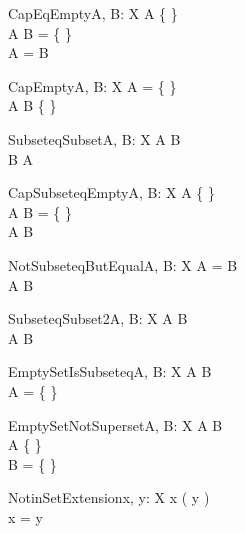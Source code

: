 \begin{theorem}{CapEqEmpty}{A, B: \power X}
A \neq \{ \} \\
A \cap B = \{ \} \\
A = B
\end{theorem}

\begin{theorem}{CapEmpty}{A, B: \power X}
A = \{ \} \\
A \cap B \neq \{ \}
\end{theorem}

\begin{theorem}{SubseteqSubset}{A, B: \power X}
A \subseteq B \\
B \subset A
\end{theorem}

\begin{theorem}{CapSubseteqEmpty}{A, B: \power X}
A \neq \{ \} \\
A \cap B = \{ \} \\
A \subseteq B
\end{theorem}

\begin{theorem}{NotSubseteqButEqual}{A, B: \power X}
A = B \\
\lnot A \subseteq B
\end{theorem}

\begin{theorem}{SubseteqSubset2}{A, B: \power X}
\lnot A \subseteq B \\
A \subset B
\end{theorem}

\begin{theorem}{EmptySetIsSubseteq}{A, B: \power X}
\lnot A \subseteq B \\
A = \{ \}
\end{theorem}

\begin{theorem}{EmptySetNotSuperset}{A, B: \power X}
A \subseteq B \\
A \neq \{ \} \\
B = \{ \}
\end{theorem}


\begin{theorem}{NotinSetExtension}{x, \const y: X}
x \notin \se( y ) \\
x = y
\end{theorem}



